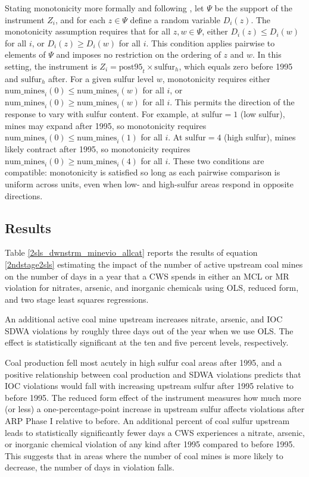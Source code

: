 \documentclass{article}
\begin{document}
Stating monotonicity more formally and following \cite{angrist1994identification}, let $\Psi$ be the support of the instrument $Z_i$, and for each $z \in \Psi$ define a random variable $D_i(z)$. The monotonicity assumption requires that for all $z, w \in \Psi$, either $D_i(z) \leq D_i(w)$ for all $i$, or $D_i(z) \geq D_i(w)$ for all $i$. This condition applies pairwise to elements of $\Psi$ and imposes no restriction on the ordering of $z$ and $w$. In this setting, the instrument is $Z_i = \text{post95}_t \times \text{sulfur}_h$, which equals zero before 1995 and $\text{sulfur}_h$ after. For a given sulfur level $w$, monotonicity requires either $\text{num_mines}_i(0) \leq \text{num_mines}_i(w)$ for all $i$, or $\text{num_mines}_i(0) \geq \text{num_mines}_i(w)$ for all $i$. This permits the direction of the response to vary with sulfur content. For example, at $\text{sulfur} = 1$ (low sulfur), mines may expand after 1995, so monotonicity requires $\text{num_mines}_i(0) \leq \text{num_mines}_i(1)$ for all $i$. At $\text{sulfur} = 4$ (high sulfur), mines likely contract after 1995, so monotonicity requires $\text{num_mines}_i(0) \geq \text{num_mines}_i(4)$ for all $i$. These two conditions are compatible: monotonicity is satisfied so long as each pairwise comparison is uniform across units, even when low- and high-sulfur areas respond in opposite directions.

\subsection{Results}

Table \ref{2sls_dwnstrm_minevio_allcat} reports the results of equation \ref{2ndstage2sls} estimating the impact of the number of active upstream coal mines on the number of days in a year that a CWS spends in either an MCL or MR violation for nitrates, arsenic, and inorganic chemicals using OLS, reduced form, and two stage least squares regressions. 

An additional active coal mine upstream increases nitrate, arsenic, and IOC SDWA violations by roughly three days out of the year when we use OLS. The effect is statistically significant at the ten and five percent levels, respectively.

Coal production fell most acutely in high sulfur coal areas after 1995, and a positive relationship between coal production and SDWA violations predicts that IOC violations would fall with increasing upstream sulfur after 1995 relative to before 1995. The reduced form effect of the instrument measures how much more (or less) a one-percentage-point increase in upstream sulfur affects violations after ARP Phase I relative to before. An additional percent of coal sulfur upstream leads to statistically significantly fewer days a CWS experiences a nitrate, arsenic, or inorganic chemical violation of any kind after 1995 compared to before 1995. This suggests that in areas where the number of coal mines is more likely to decrease, the number of days in violation falls.
\end{document}
